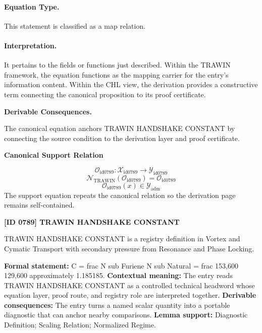 \paragraph{Equation Type.}
This statement is classified as a map relation.

\paragraph{Interpretation.}
It pertains to the fields or functions just described. Within the TRAWIN framework, the equation functions as the mapping carrier for the entry’s information content. Within the CHL view, the derivation provides a constructive term connecting the canonical proposition to its proof certificate.

\par\vspace{0.35em}
\noindent\textbf{Derivable Consequences.}\quad
\begingroup
\footnotesize
\raggedright
The canonical equation anchors TRAWIN HANDSHAKE CONSTANT by connecting the source condition to the derivation layer and proof certificate.
\par\endgroup

\noindent\textbf{Canonical Support Relation}\par
\[
\mathcal{O}_{\mathrm{id0789}}:\mathcal{X}_{\mathrm{id0789}}\longrightarrow\mathcal{Y}_{\mathrm{id0789}}
\]
\[
\mathcal{N}_{\mathrm{TRAWIN}}(\mathcal{O}_{\mathrm{id0789}})=\mathcal{O}_{\mathrm{id0789}}
\]
\[
\mathcal{O}_{\mathrm{id0789}}(x)\in\mathcal{Y}_{\mathrm{adm}}
\]
\noindent The support equation repeats the canonical relation so the derivation page remains self-contained.\par

\clearpage
\noindent\textbf{[ID 0789] TRAWIN HANDSHAKE CONSTANT}\par
\vspace{0.35em}
\begingroup\small
{}
TRAWIN HANDSHAKE CONSTANT is a registry definition in Vortex and Cymatic Transport with secondary pressure from Resonance and Phase Locking.

\begingroup\footnotesize\setlength{\emergencystretch}{3em}\sloppy
\textbf{Formal statement:} C = frac N sub Furiene N sub Natural = frac 153,600 129,600 approximately 1.185185. \textbf{Contextual meaning:} The entry reads TRAWIN HANDSHAKE CONSTANT as a controlled technical headword whose equation layer, proof route, and registry role are interpreted together. \textbf{Derivable consequences:} The entry turns a named scalar quantity into a portable diagnostic that can anchor nearby comparisons. \textbf{Lemma support:} Diagnostic Definition; Scaling Relation; Normalized Regime.\par
\endgroup

